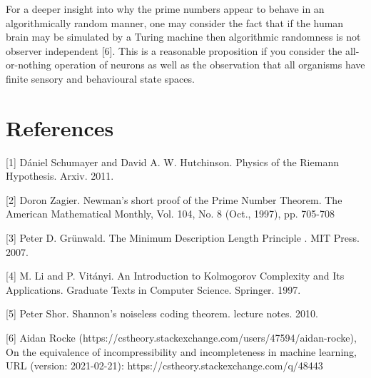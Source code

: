 \documentclass{article}
\begin{document}
For a deeper insight into why the prime numbers appear to behave in an algorithmically random manner, one
may consider the fact that if the human brain may be simulated by a Turing machine then algorithmic randomness is not observer independent [6]. This is a reasonable proposition if you consider the all-or-nothing operation of neurons as well as the observation that all organisms have finite sensory and behavioural state spaces.


\section*{References}

\small

[1] Dániel Schumayer and David A. W. Hutchinson. Physics of the Riemann Hypothesis. Arxiv. 2011.

[2] Doron Zagier. Newman's short proof of the Prime Number Theorem. The American Mathematical Monthly, Vol. 104, No. 8 (Oct., 1997), pp. 705-708

[3] Peter D. Grünwald. The Minimum Description Length Principle
. MIT Press. 2007.

[4] M. Li and P. Vitányi. An Introduction to Kolmogorov Complexity and Its Applications. Graduate Texts in Computer Science. Springer. 1997.

[5] Peter Shor. Shannon’s noiseless coding theorem. lecture notes. 2010.

[6] Aidan Rocke (https://cstheory.stackexchange.com/users/47594/aidan-rocke), On the equivalence of incompressibility and incompleteness in machine learning, URL (version: 2021-02-21): https://cstheory.stackexchange.com/q/48443
\end{document}
